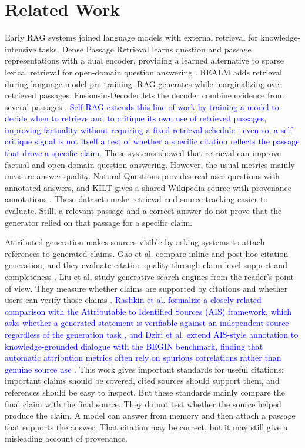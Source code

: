 \documentclass[a4paper,fleqn]{cas-sc}
\begin{document}
\section{Related Work}
\label{sec:related-work}

Early RAG systems joined language models with external retrieval for knowledge-intensive tasks. Dense Passage Retrieval learns question and passage representations with a dual encoder, providing a learned alternative to sparse lexical retrieval for open-domain question answering \cite{karpukhin2020dpr}. REALM adds retrieval during language-model pre-training. RAG generates while marginalizing over retrieved passages. Fusion-in-Decoder lets the decoder combine evidence from several passages \cite{guu2020realm,lewis2020rag,izacard2021fid}. \textcolor{blue}{Self-RAG extends this line of work by training a model to decide when to retrieve and to critique its own use of retrieved passages, improving factuality without requiring a fixed retrieval schedule \cite{asai2024selfrag}; even so, a self-critique signal is not itself a test of whether a specific citation reflects the passage that drove a specific claim.} These systems showed that retrieval can improve factual and open-domain question answering. However, the usual metrics mainly measure answer quality. Natural Questions provides real user questions with annotated answers, and KILT gives a shared Wikipedia source with provenance annotations \cite{kwiatkowski2019natural,petroni2021kilt}. These datasets make retrieval and source tracking easier to evaluate. Still, a relevant passage and a correct answer do not prove that the generator relied on that passage for a specific claim.

Attributed generation makes sources visible by asking systems to attach references to generated claims. Gao et al. compare inline and post-hoc citation generation, and they evaluate citation quality through claim-level support and completeness \cite{gao2023citations}. Liu et al. study generative search engines from the reader's point of view. They measure whether claims are supported by citations and whether users can verify those claims \cite{liu2023verifiability}. \textcolor{blue}{Rashkin et al. formalize a closely related comparison with the Attributable to Identified Sources (AIS) framework, which asks whether a generated statement is verifiable against an independent source regardless of the generation task \cite{rashkin2023measuring}, and Dziri et al. extend AIS-style annotation to knowledge-grounded dialogue with the BEGIN benchmark, finding that automatic attribution metrics often rely on spurious correlations rather than genuine source use \cite{dziri2022begin}.} This work gives important standards for useful citations: important claims should be covered, cited sources should support them, and references should be easy to inspect. But these standards mainly compare the final claim with the final source. They do not test whether the source helped produce the claim. A model can answer from memory and then attach a passage that supports the answer. That citation may be correct, but it may still give a misleading account of provenance.
\end{document}
